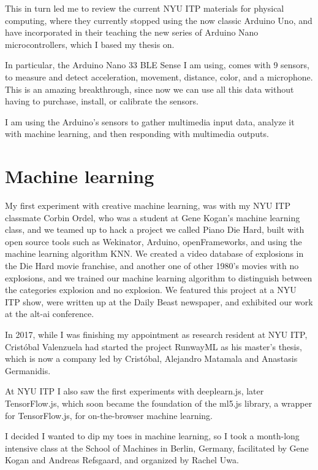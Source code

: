 This in turn led me to review the current NYU ITP materials for physical computing, where they currently stopped using the now classic Arduino Uno, and have incorporated in their teaching the new series of Arduino Nano microcontrollers, which I based my thesis on.

In particular, the Arduino Nano 33 BLE Sense I am using, comes with 9 sensors, to measure and detect acceleration, movement, distance, color, and a microphone. This is an amazing breakthrough, since now we can use all this data without having to purchase, install, or calibrate the sensors.

I am using the Arduino's sensors to gather multimedia input data, analyze it with machine learning, and then responding with multimedia outputs.

\section{Machine learning}

My first experiment with creative machine learning, was with my NYU ITP classmate Corbin Ordel, who was a student at Gene Kogan's machine learning class, and we teamed up to hack a project we called Piano Die Hard, built with open source tools such as Wekinator, Arduino, openFrameworks, and using the machine learning algorithm KNN. We created a video database of explosions in the Die Hard movie franchise, and another one of other 1980's movies with no explosions, and we trained our machine learning algorithm to distinguish between the categories explosion and no explosion. We featured this project at a NYU ITP show, were written up at the Daily Beast newspaper, and exhibited our work at the alt-ai conference.

In 2017, while I was finishing my appointment as research resident at NYU ITP, Cristóbal Valenzuela had started the project RunwayML as his master's thesis, which is now a company led by Cristóbal, Alejandro Matamala and Anastasis Germanidis.

At NYU ITP I also saw the first experiments with deeplearn.js, later TensorFlow.js, which soon became the foundation of the ml5.js library, a wrapper for TensorFlow.js, for on-the-browser machine learning.

I decided I wanted to dip my toes in machine learning, so I took a month-long intensive class at the School of Machines in Berlin, Germany, facilitated by Gene Kogan and Andreas Refsgaard, and organized by Rachel Uwa.



